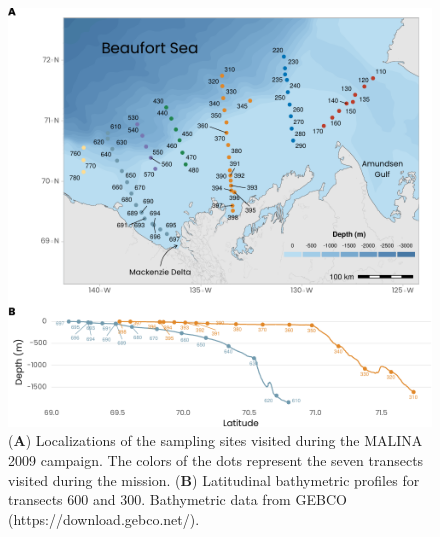 \documentclass[essd, manuscript]{copernicus}
\begin{document}
\begin{figure}[H]
	\centering
	\includegraphics[scale = 1]{../../../graphs/fig01.pdf}
	\caption{(\textbf{A}) Localizations of the sampling sites visited during the MALINA 2009 campaign. The colors of the dots represent the seven transects visited during the mission. (\textbf{B}) Latitudinal bathymetric profiles for transects 600 and 300. Bathymetric data from GEBCO (https://download.gebco.net/).}
\end{figure}

\clearpage
\end{document}
